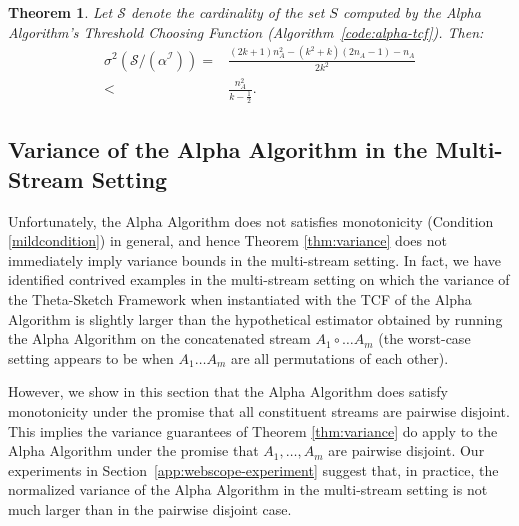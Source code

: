 \documentclass{article}
\newcommand{\edit}[1]{{#1}}
\newtheorem{theorem}{Theorem}[section]
\begin{document}
\begin{theorem}\label{thm:alpha-basic-variance}
Let $\mathcal{S}$ denote the cardinality of the set $S$ computed by the Alpha Algorithm's Threshold Choosing Function (Algorithm~\ref{code:alpha-tcf}). Then:
\begin{align}
\sigma^2(\mathcal{S}/(\alpha^\mathcal{I})) = & \frac{(2k+1)n_A^2 - (k^2+k)(2n_A-1)- n_A}{2k^2} \\
                         < & \frac{n_A^2}{k - \frac{1}{2}}.
\end{align}
\end{theorem}

\subsection{Variance of the Alpha Algorithm in the Multi-Stream Setting}
\label{multistream}
Unfortunately, the Alpha Algorithm does not satisfies monotonicity (Condition \ref{mildcondition}) in general,
and hence Theorem \ref{thm:variance} does not immediately imply variance bounds
in the multi-stream setting. In fact, we have identified contrived examples
in the multi-stream setting on which the variance of the Theta-Sketch Framework when instantiated with the TCF of the Alpha Algorithm
is slightly larger than the hypothetical estimator obtained by running the Alpha Algorithm on the concatenated stream $A_1 \circ \dots A_m$ (the worst-case
setting appears to be when $A_1 \dots A_m$ are all permutations of each other). 

However, we show in this section that the Alpha Algorithm does satisfy monotonicity under the promise that all constituent streams are pairwise disjoint.
This implies the variance guarantees of Theorem \ref{thm:variance} do apply to the Alpha Algorithm under the promise that $A_1, \dots, A_m$ are pairwise disjoint.
Our experiments in Section~\ref{app:webscope-experiment} suggest that, in practice, the \edit{normalized} variance of the Alpha Algorithm in the multi-stream setting is not much larger than in the pairwise disjoint case.
\end{document}
